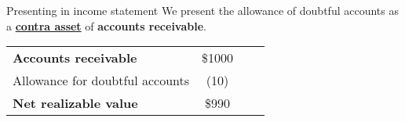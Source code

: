 \begin{knBox}
    {Presenting in income statement}
    We present the allowance of doubtful accounts as a \hyperref[def:contra]{\textbf{contra asset}} of \textbf{accounts receivable}.

    \begin{tabular}{lccc}
        \textbf{Accounts receivable}          & \$1000 \\
        \quad Allowance for doubtful accounts & (10)   \\
        \textbf{Net realizable value}         & \$990  \\
    \end{tabular}
\end{knBox}

